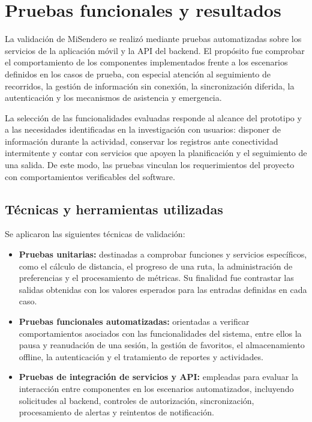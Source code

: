 \section{Pruebas funcionales y resultados}\label{sec:pruebas-funcionales}

La validación de MiSendero se realizó mediante pruebas automatizadas sobre los servicios de la aplicación móvil y la API del backend. El propósito fue comprobar el comportamiento de los componentes implementados frente a los escenarios definidos en los casos de prueba, con especial atención al seguimiento de recorridos, la gestión de información sin conexión, la sincronización diferida, la autenticación y los mecanismos de asistencia y emergencia.

La selección de las funcionalidades evaluadas responde al alcance del prototipo y a las necesidades identificadas en la investigación con usuarios: disponer de información durante la actividad, conservar los registros ante conectividad intermitente y contar con servicios que apoyen la planificación y el seguimiento de una salida. De este modo, las pruebas vinculan los requerimientos del proyecto con comportamientos verificables del software.

\subsection{Técnicas y herramientas utilizadas}

Se aplicaron las siguientes técnicas de validación:

\begin{itemize}
    \item \textbf{Pruebas unitarias:} destinadas a comprobar funciones y servicios específicos, como el cálculo de distancia, el progreso de una ruta, la administración de preferencias y el procesamiento de métricas. Su finalidad fue contrastar las salidas obtenidas con los valores esperados para las entradas definidas en cada caso.
    \item \textbf{Pruebas funcionales automatizadas:} orientadas a verificar comportamientos asociados con las funcionalidades del sistema, entre ellos la pausa y reanudación de una sesión, la gestión de favoritos, el almacenamiento offline, la autenticación y el tratamiento de reportes y actividades.
    \item \textbf{Pruebas de integración de servicios y API:} empleadas para evaluar la interacción entre componentes en los escenarios automatizados, incluyendo solicitudes al backend, controles de autorización, sincronización, procesamiento de alertas y reintentos de notificación.
\end{itemize}

